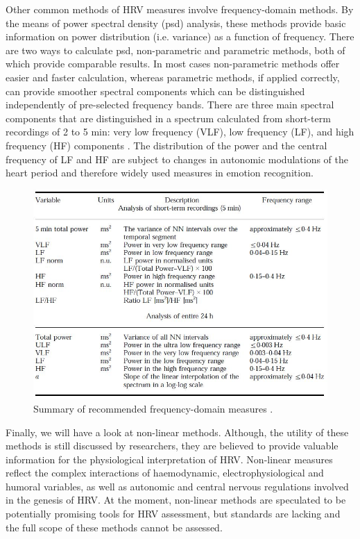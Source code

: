 Other common methods of HRV measures involve frequency-domain methods. By the means of power spectral density (\gls{psd}) analysis, these methods provide basic information on power distribution (i.e. variance) as a function of frequency. There are two ways to calculate \gls{psd}, non-parametric and parametric methods, both of which provide comparable results. In most cases non-parametric methods offer easier and faster calculation, whereas parametric methods, if applied correctly, can provide smoother spectral components which can be distinguished independently of pre-selected frequency bands. There are three main spectral components that are distinguished in a spectrum calculated from short-term
recordings of 2 to 5 min: very low frequency (VLF), low frequency (LF), and high frequency (HF) components \cite{TheEuropeanSocietyofCardiology1996}. The distribution of the power and the central frequency of LF and HF are subject to changes in autonomic modulations of the heart period and therefore widely used measures in emotion recognition. 

\newpage

\begin{figure}[h!]
	\centering
  \includegraphics[width=1.0\textwidth, angle=0]{images/SelectedFrequencyDomainMeasures.jpg}
	\caption[HRV Frequency-Domain Measures Recommendation]{Summary of recommended frequency-domain measures \cite{TheEuropeanSocietyofCardiology1996}. }
	\label{tdf}
\end{figure}

Finally, we will have a look at non-linear methods. Although, the utility of these methods is still discussed by researchers, they are believed to provide valuable information for the physiological interpretation of HRV. Non-linear measures reflect the complex interactions of haemodynamic, electrophysiological and humoral variables, as well as autonomic and central
nervous regulations involved in the genesis of HRV. At the moment, non-linear methods are speculated to be potentially promising tools for HRV assessment, but standards are lacking and the full scope of these methods cannot be assessed.

